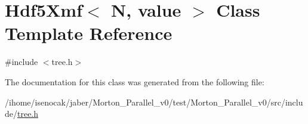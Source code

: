 \hypertarget{classHdf5Xmf}{}\section{Hdf5\+Xmf$<$ N, value $>$ Class Template Reference}
\label{classHdf5Xmf}


{\ttfamily \#include $<$tree.\+h$>$}



The documentation for this class was generated from the following file\+:\begin{DoxyCompactItemize}
\item 
/ihome/isenocak/jaber/\+Morton\+\_\+\+Parallel\+\_\+v0/test/\+Morton\+\_\+\+Parallel\+\_\+v0/src/include/\mbox{\hyperlink{tree_8h}{tree.\+h}}\end{DoxyCompactItemize}
